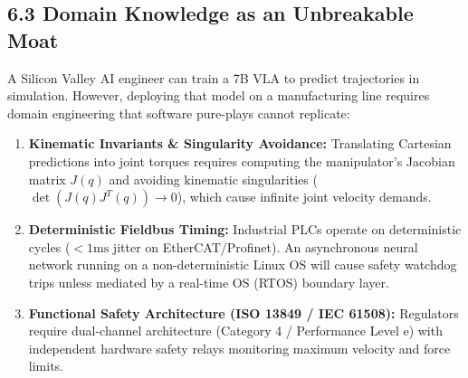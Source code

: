 \documentclass[11pt,a4paper]{article}
\begin{document}
\subsection{6.3 Domain Knowledge as an Unbreakable Moat}
A Silicon Valley AI engineer can train a 7B VLA to predict trajectories in simulation. However, deploying that model on a manufacturing line requires domain engineering that software pure-plays cannot replicate:
\begin{enumerate}
    \item \textbf{Kinematic Invariants \& Singularity Avoidance:} Translating Cartesian predictions into joint torques requires computing the manipulator's Jacobian matrix $J(q)$ and avoiding kinematic singularities ($\det(J(q)J^T(q)) \to 0$), which cause infinite joint velocity demands.
    \item \textbf{Deterministic Fieldbus Timing:} Industrial PLCs operate on deterministic cycles ($<1\text{ms}$ jitter on EtherCAT/Profinet). An asynchronous neural network running on a non-deterministic Linux OS will cause safety watchdog trips unless mediated by a real-time OS (RTOS) boundary layer.
    \item \textbf{Functional Safety Architecture (ISO 13849 / IEC 61508):} Regulators require dual-channel architecture (Category 4 / Performance Level e) with independent hardware safety relays monitoring maximum velocity and force limits.
\end{enumerate}
\end{document}
